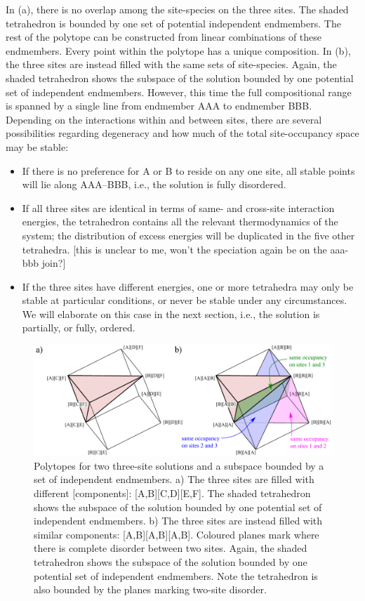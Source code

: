\documentclass[preprint,12pt]{elsarticle}
\begin{document}
In (a), there is no overlap among the site-species on the three sites. The shaded tetrahedron is bounded by one set of potential independent endmembers. The rest of the polytope can be constructed from linear combinations of these endmembers. Every point within the polytope has a unique composition. In (b), the three sites are instead filled with the same sets of site-species. Again, the shaded tetrahedron shows the subspace of the solution bounded by one potential set of independent endmembers. However, this time the full compositional range is spanned by a single line from endmember AAA to endmember BBB. Depending on the interactions within and between sites, there are several possibilities regarding degeneracy and how much of the total site-occupancy space may be stable:

\begin{itemize}
    \item If there is no preference for A or B to reside on any one site, all stable points will lie along AAA--BBB, i.e., the solution is fully disordered.
    \item If all three sites are identical in terms of same- and cross-site interaction energies, the tetrahedron contains all the relevant thermodynamics of the system; the distribution of excess energies will be duplicated in the five other tetrahedra. [this is unclear to me, won't the speciation again be on the aaa-bbb join?]
    \item If the three sites have different energies, one or more tetrahedra may only be stable at particular conditions, or never be stable under any circumstances. We will elaborate on this case in the next section, i.e., the solution is partially, or fully, ordered.
\end{itemize}



\begin{figure}[htb!]
  \centering
  \includegraphics[width=\textwidth]{figures/solid_solution_polytopes_degenerate.pdf}
  \caption{Polytopes for two three-site solutions and a subspace bounded by a set of independent endmembers. a) The three sites are filled with different [components]: [A,B][C,D][E,F]. The shaded tetrahedron shows the subspace of the solution bounded by one potential set of independent endmembers. b) The three sites are instead filled with similar components: [A,B][A,B][A,B]. Coloured planes mark where there is complete disorder between two sites. Again, the shaded tetrahedron shows the subspace of the solution bounded by one potential set of independent endmembers. Note the tetrahedron is also bounded by the planes marking two-site disorder.}
  \label{fig:subspaces}
\end{figure}
\end{document}
